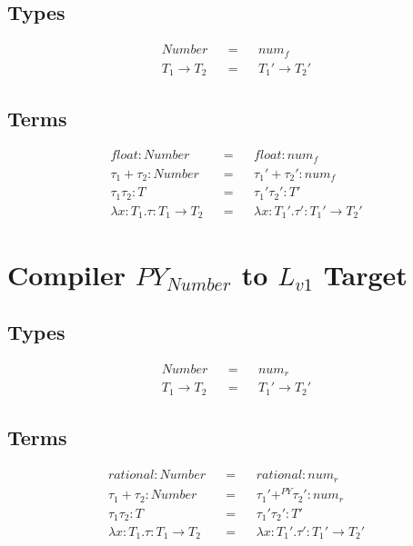 \documentclass{article}
\begin{document}
	\subsection{Types}
	\begin{align*}
		Number					&& = && num_f\\
		T_1 \rightarrow T_2 	&& = && T_1' \rightarrow T_2'
	\end{align*}
	
	\subsection{Terms}
	\begin{align*}
	float: Number							 && = && float: num_f\\
	\tau_1 + \tau_2: Number					 && = && \tau_1' + \tau_2': num_f\\
	\tau_1 \tau_2: T						 && = && \tau_1' \tau_2': T'\\
	\lambda x: T_1.\tau: T_1 \rightarrow T_2 && = && \lambda x: T_1'.\tau': T_1' \rightarrow T_2'
	\end{align*}
	
	
	\section{Compiler $PY_{Number}$ to $L_{v1}$ Target}
	
	\subsection{Types}
	\begin{align*}
	Number					&& = && num_r\\
	T_1 \rightarrow T_2 	&& = && T_1' \rightarrow T_2'
	\end{align*}
	
	\subsection{Terms}
	\begin{align*}
	rational: Number						 && = && rational: num_r\\
	\tau_1 + \tau_2: Number					 && = && \tau_1' +^{PY} \tau_2': num_r\\
	\tau_1 \tau_2: T						 && = && \tau_1' \tau_2': T'\\
	\lambda x: T_1.\tau: T_1 \rightarrow T_2 && = && \lambda x: T_1'.\tau': T_1' \rightarrow T_2'
	\end{align*}
\end{document}
